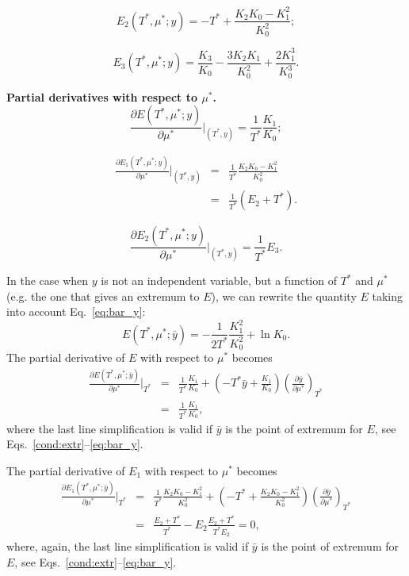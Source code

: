 \documentclass[12pt]{article}
\numberwithin{equation}{section}
\begin{document}
	\begin{equation}
		E_2(T^*,\mu^*;y) = -T^* + \frac{K_2 K_0 - K_1^2}{K_0^2};
	\end{equation}
	
	\begin{equation}
		E_3(T^*,\mu^*;y) = \frac{K_3}{K_0} - \frac{3 K_2 K_1}{K_0^2} + \frac{2K_1^3}{K_0^3}.
	\end{equation}
	
	\textbf{Partial derivatives with respect to $\mu^*$.}
	\begin{equation}
		\frac{\partial E(T^*,\mu^*;y)}{\partial \mu^*} \bigg|_{(T^*,y)} = \frac{1}{T^*}\frac{K_1}{K_0};
	\end{equation}
	
	\begin{eqnarray}
		\frac{\partial E_1(T^*,\mu^*;y)}{\partial \mu^*} \bigg|_{(T^*,y)} & = & \frac{1}{T^*} \frac{K_2 K_0 - K_1^2}{K_0^2}
		\nonumber\\
		& = & \frac{1}{T^*} \left(E_2 + T^*\right).
	\end{eqnarray}
	
	\begin{equation}
		\frac{\partial E_2(T^*,\mu^*;y)}{\partial \mu^*} \bigg|_{(T^*,y)} = \frac{1}{T^*} E_3.
	\end{equation}
	
	In the case when $y$ is not an independent variable, but a function of $T^*$ and $\mu^*$ (e.g. the one that gives an extremum to $E$), we can rewrite the quantity $E$ taking into account Eq.~\eqref{eq:bar_y}:
	\begin{equation}
		E(T^*,\mu^*;\bar{y}) = -\frac{1}{2T^*}\frac{K_1^2}{K_0^2} + \ln K_0.
	\end{equation}
	The partial derivative of $E$ with respect to $\mu^*$ becomes
	\begin{eqnarray}
		\frac{\partial E(T^*,\mu^*;\bar{y})}{\partial \mu^*} \bigg|_{T^*}
		& = & \frac{1}{T^*} \frac{K_1}{K_0} + \left( -T^*\bar{y} + \frac{K_1}{K_0} \right) \left(\frac{\partial\bar{y}}{\partial \mu^*}\right)_{T^*} 
		\nonumber\\
		& = & \frac{1}{T^*} \frac{K_1}{K_0},
	\end{eqnarray}
	where the last line simplification is valid if $\bar{y}$ is the point of extremum for $E$, see Eqs.~\eqref{cond:extr}--\eqref{eq:bar_y}.
	
	The partial derivative of $E_1$ with respect to $\mu^*$ becomes
	\begin{eqnarray}
		\frac{\partial E_1(T^*,\mu^*;\bar{y})}{\partial \mu^*} \bigg|_{T^*} & = & \frac{1}{T^*} \frac{K_2 K_0 - K_1^2}{K_0^2} + \left(-T^* + \frac{K_2 K_0 - K_1^2}{K_0^2}\right) \left(\frac{\partial\bar{y}}{\partial \mu^*}\right)_{T^*}
		\nonumber\\
		& = & \frac{E_2 + T^*}{T^*} - E_2 \frac{E_2 + T^*}{T^* E_2} = 0,
	\end{eqnarray}
	where, again, the last line simplification is valid if $\bar{y}$ is the point of extremum for $E$, see Eqs.~\eqref{cond:extr}--\eqref{eq:bar_y}.
	
\end{document}
